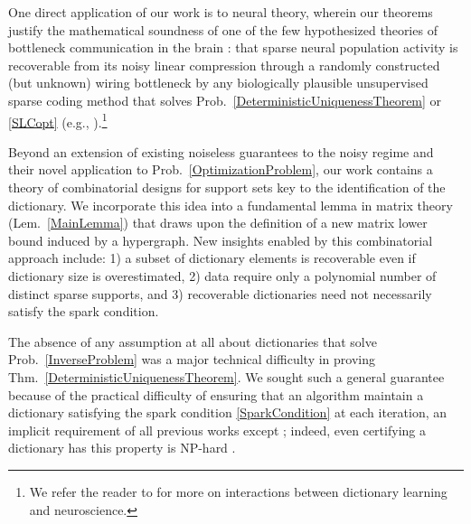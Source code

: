 \documentclass[journal, twocolumn]{IEEEtran}
\begin{document}
One direct application of our work is to neural theory, wherein our theorems justify the mathematical soundness of one of the few hypothesized theories of bottleneck communication in the brain \cite{Isely10}: that sparse neural population activity is recoverable from its noisy linear compression through a randomly constructed (but unknown) wiring bottleneck by any biologically plausible unsupervised sparse coding method that solves Prob.~\ref{DeterministicUniquenessTheorem} or \ref{SLCopt} (e.g., \cite{rehnsommer2007, rozell2007neurally, pehlevan2015normative}).\footnote{We refer the reader to \cite{ganguli2012compressed} for more on interactions between dictionary learning and neuroscience.}






Beyond an extension of existing noiseless guarantees \cite{Hillar15} to the noisy regime and their novel application to Prob.~\ref{OptimizationProblem}, our work contains a theory of combinatorial designs for support sets key to the identification of the dictionary. We incorporate this idea into a fundamental lemma in matrix theory (Lem.~\ref{MainLemma}) that draws upon the definition of a new matrix lower bound induced by a hypergraph. New insights enabled by this combinatorial approach include: 1) a subset of dictionary elements is recoverable even if dictionary size is overestimated, 2) data require only a polynomial number of distinct sparse supports, and 3) recoverable dictionaries need not necessarily satisfy the spark condition. 

The absence of any assumption at all about dictionaries that solve Prob.~\ref{InverseProblem} was a major technical difficulty in proving Thm.~\ref{DeterministicUniquenessTheorem}. We sought such a general guarantee because of the practical difficulty of ensuring that an algorithm maintain a dictionary satisfying the spark condition \eqref{SparkCondition} at each iteration, an implicit requirement of all previous works except \cite{Hillar15}; indeed, even certifying a dictionary has this property is NP-hard \cite{tillmann2014computational}.
\end{document}
